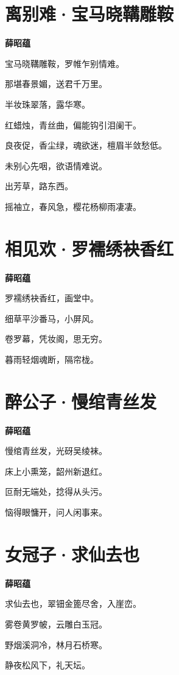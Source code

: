 \documentclass[12pt,a4paper]{ctexbook}
\begin{document}
\section{离别难·宝马晓鞲雕鞍}
\textbf{薛昭蕴}\par\vspace{0.5em}
宝马晓鞲雕鞍，罗帷乍别情难。\par
那堪春景媚，送君千万里。\par
半妆珠翠落，露华寒。\par
红蜡烛，青丝曲，偏能钩引泪阑干。\par
良夜促，香尘绿，魂欲迷，檀眉半敛愁低。\par
未别心先咽，欲语情难说。\par
出芳草，路东西。\par
摇袖立，春风急，樱花杨柳雨凄凄。\par

\section{相见欢·罗襦绣袂香红}
\textbf{薛昭蕴}\par\vspace{0.5em}
罗襦绣袂香红，画堂中。\par
细草平沙番马，小屏风。\par
卷罗幕，凭妆阁，思无穷。\par
暮雨轻烟魂断，隔帘栊。\par

\section{醉公子·慢绾青丝发}
\textbf{薛昭蕴}\par\vspace{0.5em}
慢绾青丝发，光砑吴绫袜。\par
床上小熏笼，韶州新退红。\par
叵耐无端处，捻得从头污。\par
恼得眼慵开，问人闲事来。\par

\section{女冠子·求仙去也}
\textbf{薛昭蕴}\par\vspace{0.5em}
求仙去也，翠钿金篦尽舍，入崖峦。\par
雾卷黄罗帔，云雕白玉冠。\par
野烟溪洞冷，林月石桥寒。\par
静夜松风下，礼天坛。\par
\end{document}
